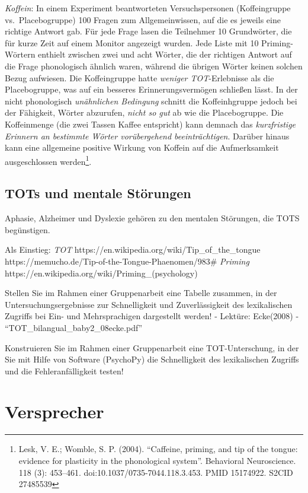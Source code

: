 \documentclass[
  letterpaper,
]{scrbook}
\begin{document}
\emph{Koffein}: In einem Experiment beantworteten Versuchspersonen
(Koffeingruppe vs.~Placebogruppe) 100 Fragen zum Allgemeinwissen, auf
die es jeweils eine richtige Antwort gab. Für jede Frage lasen die
Teilnehmer 10 Grundwörter, die für kurze Zeit auf einem Monitor
angezeigt wurden. Jede Liste mit 10 Priming-Wörtern enthielt zwischen
zwei und acht Wörter, die der richtigen Antwort auf die Frage
phonologisch ähnlich waren, während die übrigen Wörter keinen solchen
Bezug aufwiesen. Die Koffeingruppe hatte \emph{weniger TOT}-Erlebnisse
als die Placebogruppe, was auf ein besseres Erinnerungsvermögen
schließen lässt. In der nicht phonologisch \emph{unähnlichen Bedingung}
schnitt die Koffeinhgruppe jedoch bei der Fähigkeit, Wörter abzurufen,
\emph{nicht so gut} ab wie die Placebogruppe. Die Koffeinmenge (die zwei
Tassen Kaffee entspricht) kann demnach das \emph{kurzfristige Erinnern
an bestimmte Wörter vorübergehend beeinträchtigen}. Darüber hinaus kann
eine allgemeine positive Wirkung von Koffein auf die Aufmerksamkeit
ausgeschlossen werden\footnote{Lesk, V. E.; Womble, S. P. (2004).
  ``Caffeine, priming, and tip of the tongue: evidence for plasticity in
  the phonological system''. Behavioral Neuroscience. 118 (3): 453--461.
  doi:10.1037/0735-7044.118.3.453. PMID 15174922. S2CID 27485539}.

\hypertarget{tots-und-mentale-stuxf6rungen}{%
\section{TOTs und mentale
Störungen}\label{tots-und-mentale-stuxf6rungen}}

Aphasie, Alzheimer und Dyslexie gehören zu den mentalen Störungen, die
TOTS begünstigen.

Als Einstieg: \emph{TOT}
https://en.wikipedia.org/wiki/Tip\_of\_the\_tongue
https://memucho.de/Tip-of-the-Tongue-Phaenomen/983\# \emph{Priming}
https://en.wikipedia.org/wiki/Priming\_(psychology)

Stellen Sie im Rahmen einer Gruppenarbeit eine Tabelle zusammen, in der
Untersuchungsergebnisse zur Schnelligkeit und Zuverlässigkeit des
lexikalischen Zugriffs bei Ein- und Mehrsprachigen dargestellt werden! -
Lektüre: Ecke(2008) - ``TOT\_bilangual\_baby2\_08ecke.pdf''

Konstruieren Sie im Rahmen einer Gruppenarbeit eine TOT-Unterschung, in
der Sie mit Hilfe von Software (PsychoPy) die Schnelligkeit des
lexikalischen Zugriffs und die Fehleranfälligkeit testen!

\hypertarget{sec-versprecher}{%
\chapter{Versprecher}\label{sec-versprecher}}
\end{document}
